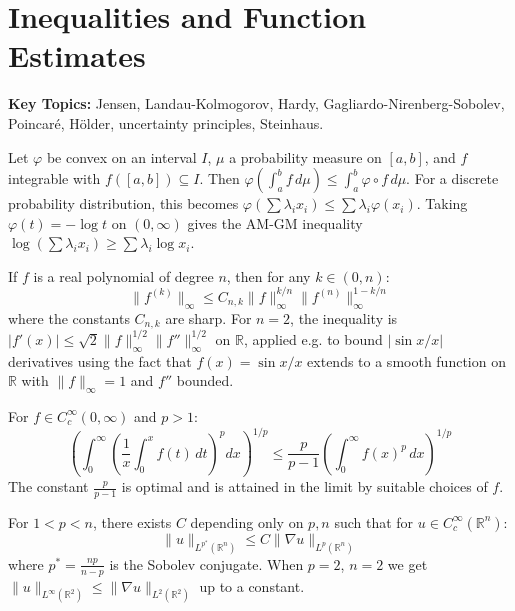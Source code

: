 \section{Inequalities and Function Estimates}

\textbf{Key Topics:} Jensen, Landau-Kolmogorov, Hardy, Gagliardo-Nirenberg-Sobolev, Poincaré, Hölder, uncertainty principles, Steinhaus.

\begin{example}
Let $\varphi$ be convex on an interval $I$, $\mu$ a probability measure on $[a,b]$, and $f$ integrable with $f([a,b]) \subseteq I$. Then $\varphi\left(\int_a^b f \,d\mu\right) \leq \int_a^b \varphi \circ f \,d\mu$. For a discrete probability distribution, this becomes $\varphi\left(\sum \lambda_i x_i\right) \leq \sum \lambda_i \varphi(x_i)$. Taking $\varphi(t) = -\log t$ on $(0,\infty)$ gives the AM-GM inequality $\log\left(\sum \lambda_i x_i\right) \geq \sum \lambda_i \log x_i$.
\end{example}

\begin{example}
If $f$ is a real polynomial of degree $n$, then for any $k \in (0,n)$:
\[ \|f^{(k)}\|_\infty \leq C_{n,k} \|f\|_\infty^{k/n} \|f^{(n)}\|_\infty^{1-k/n} \]
where the constants $C_{n,k}$ are sharp. For $n=2$, the inequality is $|f'(x)| \leq \sqrt{2}\|f\|_\infty^{1/2}\|f''\|_\infty^{1/2}$ on $\mathbb{R}$, applied e.g. to bound $|\sin x / x|$ derivatives using the fact that $f(x) = \sin x / x$ extends to a smooth function on $\mathbb{R}$ with $\|f\|_\infty = 1$ and $f''$ bounded.
\end{example}

\begin{example}
For $f \in C_c^\infty(0,\infty)$ and $p>1$:
\[ \left(\int_0^\infty \left(\frac{1}{x} \int_0^x f(t)\,dt\right)^p dx\right)^{1/p} \leq \frac{p}{p-1} \left(\int_0^\infty f(x)^p \,dx\right)^{1/p} \]
The constant $\frac{p}{p-1}$ is optimal and is attained in the limit by suitable choices of $f$.
\end{example}

\begin{example}
For $1 < p < n$, there exists $C$ depending only on $p,n$ such that for $u \in C_c^\infty(\mathbb{R}^n)$:
\[ \|u\|_{L^{p^*}(\mathbb{R}^n)} \leq C \|\nabla u\|_{L^p(\mathbb{R}^n)} \]
where $p^* = \frac{np}{n-p}$ is the Sobolev conjugate. When $p=2$, $n=2$ we get $\|u\|_{L^\infty(\mathbb{R}^2)} \leq \|\nabla u\|_{L^2(\mathbb{R}^2)}$ up to a constant.
\end{example}

